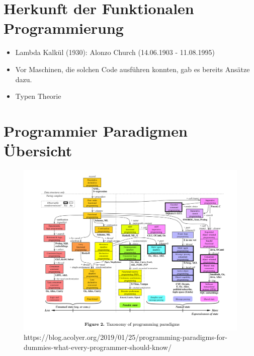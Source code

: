 \documentclass{beamer}
\begin{document}
\section{Herkunft der Funktionalen Programmierung}
\begin{frame}

	\begin{itemize}
		\item Lambda Kalkül (1930): Alonzo Church (14.06.1903 - 11.08.1995)
		\item Vor Maschinen, die solchen Code ausführen konnten, gab es bereits Ansätze dazu.
            \item Typen Theorie
	\end{itemize}

\end{frame}

\section{Programmier Paradigmen Übersicht}
\begin{frame}
	\begin{figure}
	    \centering
	    \includegraphics[width=0.9\linewidth]{bilder/Programming-paradigms.png}
	    \textmd{ \tiny https://blog.acolyer.org/2019/01/25/programming-paradigms-for-dummies-what-every-programmer-should-know/}
	\end{figure}
\end{frame}
\end{document}
